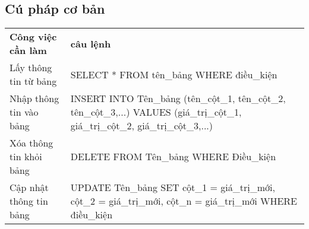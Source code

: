 \subsection{Cú pháp cơ bản}
\begin{center}

\begin{tabularx}{\linewidth}{|l|X|}
 \cline{1-2}
 \textbf{Công việc cần làm} & \textbf{câu lệnh} \\ \cline{1-2}
 Lấy thông tin từ bảng & SELECT * FROM tên\_bảng WHERE điều\_kiện \\ \cline{1-2}
 Nhập thông tin vào bảng & INSERT INTO Tên\_bảng (tên\_cột\_1, tên\_cột\_2, tên\_cột\_3,...) VALUES (giá\_trị\_cột\_1, giá\_trị\_cột\_2, giá\_trị\_cột\_3,...)\\ \cline{1-2}
 Xóa thông tin khỏi bảng & DELETE FROM Tên\_bảng WHERE Điều\_kiện\\ \cline{1-2}
 Cập nhật thông tin bảng & UPDATE Tên\_bảng SET cột\_1 = giá\_trị\_mới, cột\_2 = giá\_trị\_mới, cột\_n = giá\_trị\_mới WHERE điều\_kiện\\ \cline{1-2}
\end{tabularx}
\end{center}
